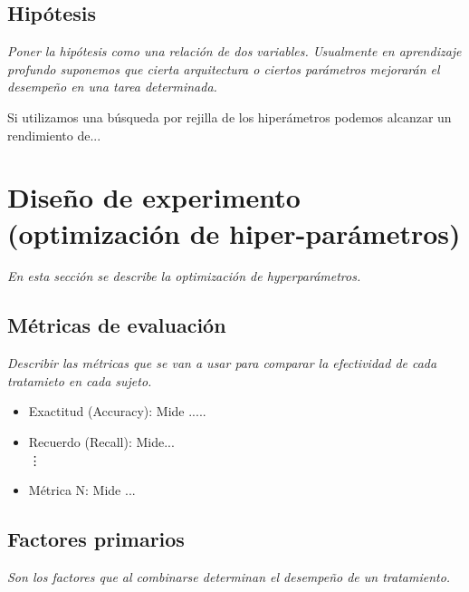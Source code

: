 \documentclass[11pt,twoside,letterpaper]{article}
\begin{document}


\subsection{Hipótesis}

\emph{Poner la hipótesis como una relación de dos variables. Usualmente en aprendizaje profundo suponemos que cierta arquitectura o ciertos parámetros mejorarán el desempeño en una tarea determinada.}

Si utilizamos una búsqueda por rejilla de los hiperámetros podemos alcanzar un rendimiento de...

\section{Diseño de experimento (optimización de hiper-parámetros)}

\emph{En esta sección se describe la optimización de hyperparámetros.}

\subsection{Métricas de evaluación}

\emph{Describir las métricas que se van a usar para comparar la efectividad de cada tratamieto en cada sujeto.}

\begin{itemize}
    \item Exactitud (Accuracy): Mide .....
    \item Recuerdo (Recall): Mide... \\
    \vdots
    \item Métrica N: Mide ...
\end{itemize}

\subsection{Factores primarios}

\emph{Son los factores que al combinarse determinan el desempeño de un tratamiento.}
\end{document}
